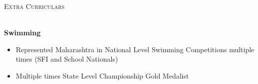 \documentclass[a4paper]{article}
\newcommand{\lineunder} {
    \vspace*{-8pt} \\
    \hspace*{-18pt} \hrulefill \\
}
\newcommand{\header} [1] {
    {\hspace*{-18pt}\vspace*{6pt} \textsc{#1}}
    \vspace*{-6pt} \lineunder
}
\begin{document}
\vspace{2mm}
      \header{Extra Curriculars}
      \vspace{1mm}

      \textbf{Swimming} 
          \vspace{-1mm}
      \begin{itemize} \itemsep 1pt
            \item Represented Maharashtra in National Level Swimming Competitions multiple times (SFI and School Nationals)
            \item Multiple times State Level Championship Gold Medalist
      \end{itemize}

    
\end{document}
